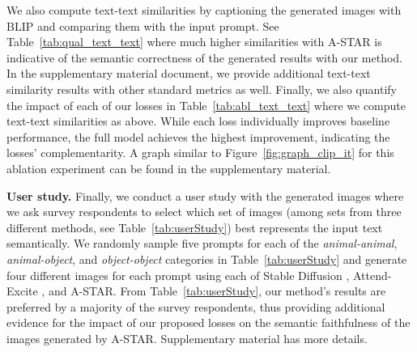 \documentclass[10pt,twocolumn,letterpaper]{article}
\begin{document}
We also compute text-text similarities by captioning the generated images with BLIP \cite{li2022blip} and comparing them with the input prompt. See Table~\ref{tab:qual_text_text} where much higher similarities with A-STAR is indicative of the semantic correctness of the generated results with our method. In the supplementary material document, we provide additional text-text similarity results with other standard metrics as well.
Finally, we also quantify the impact of each of our losses in Table~\ref{tab:abl_text_text} where we compute text-text similarities as above. While each loss individually improves baseline  \cite{rombach2022high} performance, the full model achieves the highest improvement, indicating the losses' complementarity. A graph similar to Figure~\ref{fig:graph_clip_it} for this ablation experiment can be found in the supplementary material.

\textbf{User study.} Finally, we conduct a user study with the generated images where we ask survey respondents to select which set of images (among sets from three different methods, see Table~\ref{tab:userStudy}) best represents the input text semantically. We randomly sample five prompts for each of the \textit{animal-animal}, \textit{animal-object}, and \textit{object-object} categories in Table~\ref{tab:userStudy} and generate four different images for each prompt using each of Stable Diffusion \cite{rombach2022high}, Attend-Excite \cite{chefer2023attend}, and A-STAR. From Table~\ref{tab:userStudy}, our method's results are preferred by a majority of the survey respondents, thus providing additional evidence for the impact of our proposed losses on the semantic faithfulness of the images generated by A-STAR. Supplementary material has more details.

\begin{table}[]
    \vspace{-8pt}
    \caption{Results from a user survey with $26$ respondents.}
    \vspace{-4pt}
    \label{tab:userStudy}
\end{table}
\end{document}
